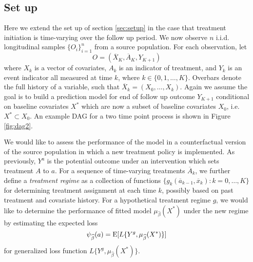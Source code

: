 \subsection{Set up}
Here we extend the set up of section \ref{sec:setup} in the case that treatment initiation is time-varying over the follow up period. We now observe $n$ i.i.d. longitudinal samples $\{O_i\}_{i=1}^n$ from a source population. For each observation, let 
\[O =(\overline{X}_K, \overline{A}_K, Y_{K+1})\]
where $X_k$ is a vector of covariates, $A_k$ is an indicator of treatment, and $Y_k$ is an event indicator all measured at time $k$, where $k \in \{0,1,\ldots, K\}$. Overbars denote the full history of a variable, such that $\overline{X}_k = (X_0,\dots, X_k)$. Again we assume the goal is to build a prediction model for end of follow up outcome $Y_{K+1}$ conditional on baseline covariates $X^*$ which are now a subset of baseline covariates $X_0$, i.e. $X^* \subset X_0$. An example DAG for a two time point process is shown in Figure \ref{fig:dag2}.

We would like to assess the performance of the model in a counterfactual version of the source population in which a new treatment policy is implemented. As previously, $Y^a$ is the potential outcome under an intervention which sets treatment $A$ to $a$. For a sequence of time-varying treatments $\overline{A}_k$, we further define a \textit{treatment regime} as a collection of functions $\{g_k(\overline{a}_{k-1}, \overline{x}_k): k=0,\ldots, K\}$ for determining treatment assignment at each time $k$, possibly based on past treatment and covariate history. For a hypothetical treatment regime $g$, we would like to determine the performance of fitted model $\mu_{\widehat{\beta}}(X^*)$ under the new regime by estimating the expected loss 
$$\psi_{\widehat{\beta}}(a) = \operatorname{E}[L\{Y^g, \mu_{\widehat{\beta}}(X^*)\}]$$
for generalized loss function $L\{Y^g, \mu_{\widehat{\beta}}(X^*)\}$.


